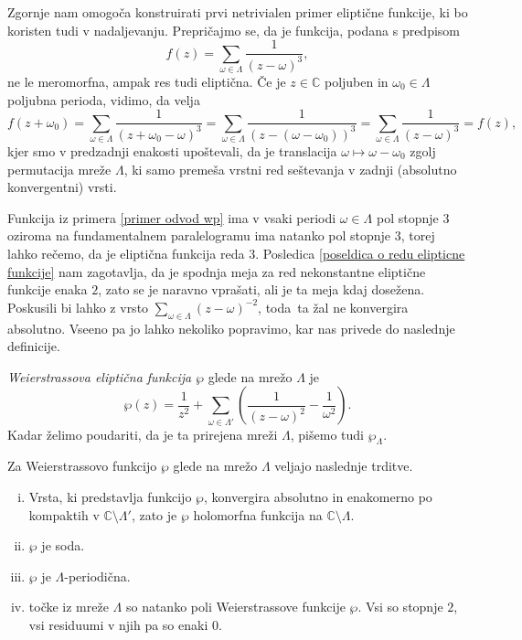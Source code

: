 \documentclass[mat1]{fmfdelo}
\numberwithin{equation}{section}
\newcommand{\C}{\mathbb C}
\newcommand{\om}{\omega}
\theoremstyle{definition}
\begin{document}
\begin{primer*}
    \label{primer odvod wp}
    Zgornje nam omogoča konstruirati prvi netrivialen primer eliptične funkcije, ki bo koristen tudi v nadaljevanju. Prepričajmo se, da je funkcija, podana s predpisom
    \[
        f(z) = \sum_{\om \in \Lambda} \frac{1}{(z - \om)^3},
    \]
    ne le meromorfna, ampak res tudi eliptična. Če je $z \in \C$ poljuben in $\om_0 \in \Lambda$ poljubna perioda, vidimo, da velja
    \[
        f(z + \om_0) = 
        \sum_{\om \in \Lambda} \frac{1}{(z + \om_0 - \om)^3} = 
        \sum_{\om \in \Lambda} \frac{1}{(z - (\om - \om_0))^3} = 
        \sum_{\om \in \Lambda} \frac{1}{(z - \om)^3} = 
        f(z),
    \]
    kjer smo v predzadnji enakosti upoštevali, da je translacija $\om \mapsto \om - \om_0$ zgolj permutacija mreže $\Lambda$, ki samo premeša vrstni red seštevanja v zadnji (absolutno konvergentni) vrsti. 
\end{primer*}

Funkcija iz primera \ref{primer odvod wp} ima v vsaki periodi $\om\in \Lambda$ pol stopnje $3$ oziroma na fundamentalnem paralelogramu ima natanko pol stopnje $3$, torej lahko rečemo, da je eliptična funkcija reda $3$. Posledica \ref{poseldica o redu elipticne funkcije} nam zagotavlja, da je spodnja meja za red nekonstantne eliptične funkcije enaka $2$, zato se je naravno vprašati, ali je ta meja kdaj dosežena. Poskusili bi lahko z vrsto $\sum_{\om\in\Lambda}(z - \om)^{-2}$, toda ta žal ne konvergira absolutno. Vseeno pa jo lahko nekoliko popravimo, kar nas privede do naslednje definicije. 

\begin{definicija}
    \emph{Weierstrassova eliptična funkcija $\wp$} glede na mrežo $\Lambda$ je
    \[
        \wp(z) = \frac{1}{z^2} + \sum_{\om\in\Lambda'}\left(\frac{1}{(z-\om)^2} - \frac{1}{\om^2}\right).
    \]
    Kadar želimo poudariti, da je ta prirejena mreži $\Lambda$, pišemo tudi $\wp_{\Lambda}$.
\end{definicija}

\begin{trditev}
    \label{lastnosti wp}
    Za Weierstrassovo funkcijo $\wp$ glede na mrežo $\Lambda$ veljajo naslednje trditve.
    \begin{enumerate}[(i)]
        \item Vrsta, ki predstavlja funkcijo $\wp$, konvergira absolutno in enakomerno po kompaktih v $\C\setminus\Lambda'$, zato je $\wp$ holomorfna funkcija na $\C \setminus \Lambda$.
        \item $\wp$ je soda.
        \item $\wp$ je $\Lambda$-periodična.
        \item točke iz mreže $\Lambda$ so natanko poli Weierstrassove funkcije $\wp$. Vsi so stopnje $2$, vsi residuumi v njih pa so enaki $0$. 
    \end{enumerate}
\end{trditev}
\end{document}
